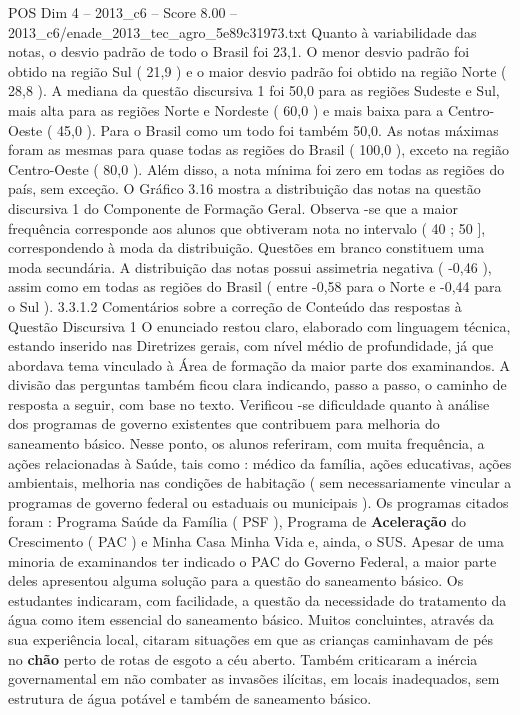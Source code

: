 \begin{textsample}{POS Dim 4 – 2013\_c6 – Score 8.00 – 2013\_c6/enade\_2013\_tec\_agro\_5e89c31973.txt}
Quanto à variabilidade das notas, o desvio padrão de todo o Brasil foi 23,1.
O menor desvio padrão foi obtido na região Sul ( 21,9 ) e o maior desvio padrão foi obtido na região Norte ( 28,8 ).
A mediana da questão discursiva 1 foi 50,0 para as regiões Sudeste e Sul, mais alta para as regiões Norte e Nordeste ( 60,0 ) e mais baixa para a Centro-Oeste ( 45,0 ).
Para o Brasil como um todo foi também 50,0.
As notas máximas foram as mesmas para quase todas as regiões do Brasil ( 100,0 ), exceto na região Centro-Oeste ( 80,0 ).
Além disso, a nota mínima foi zero em todas as regiões do país, sem exceção.
O Gráfico 3.16 mostra a distribuição das notas na questão discursiva 1 do Componente de Formação Geral.
Observa -se que a maior frequência corresponde aos alunos que obtiveram nota no intervalo ( 40 ; 50 ], correspondendo à moda da distribuição.
Questões em branco constituem uma moda secundária.
A distribuição das notas possui assimetria negativa ( -0,46 ), assim como em todas as regiões do Brasil ( entre -0,58 para o Norte e -0,44 para o Sul ). 3.3.1.2 Comentários sobre a correção de Conteúdo das respostas à Questão Discursiva 1 O enunciado restou claro, elaborado com linguagem técnica, estando inserido nas Diretrizes gerais, com nível médio de profundidade, já que abordava tema vinculado à Área de formação da maior parte dos examinandos.
A divisão das perguntas também ficou clara indicando, passo a passo, o caminho de resposta a seguir, com base no texto.
Verificou -se dificuldade quanto à análise dos programas de governo existentes que contribuem para melhoria do saneamento básico.
Nesse ponto, os alunos referiram, com muita frequência, a ações relacionadas à Saúde, tais como : médico da família, ações educativas, ações ambientais, melhoria nas condições de habitação ( sem necessariamente vincular a programas de governo federal ou estaduais ou municipais ).
Os programas citados foram : Programa Saúde da Família ( PSF ), Programa de \textbf{Aceleração} do Crescimento ( PAC ) e Minha Casa Minha Vida e, ainda, o SUS.
Apesar de uma minoria de examinandos ter indicado o PAC do Governo Federal, a maior parte deles apresentou alguma solução para a questão do saneamento básico.
Os estudantes indicaram, com facilidade, a questão da necessidade do tratamento da água como item essencial do saneamento básico.
Muitos concluintes, através da sua experiência local, citaram situações em que as crianças caminhavam de pés no \textbf{chão} perto de rotas de esgoto a céu aberto.
Também criticaram a inércia governamental em não combater as invasões ilícitas, em locais inadequados, sem estrutura de água potável e também de saneamento básico.

\end{textsample}
